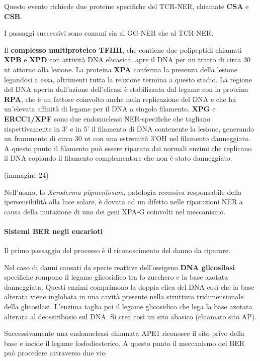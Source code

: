 \documentclass[]{article}
\begin{document}
Questo evento richiede due proteine specifiche del TCR-NER, chiamate
\textbf{CSA} e \textbf{CSB}.

I passaggi successivi sono comuni sia al GG-NER che al TCR-NER.

Il \textbf{complesso multiproteico TFIIH}, che contiene due polipeptidi
chiamati \textbf{XPB} e \textbf{XPD} con attività DNA elicasica, apre il
DNA per un tratto di circa 30 nt attorno alla lesione. La proteina
\textbf{XPA} conferma la presenza della lesione legandosi a essa,
altrimenti tutta la reazione termina a questo stadio. La regione del DNA
aperta dall'azione dell'elicasi è stabilizzata dal legame con la
proteina \textbf{RPA}, che è un fattore coinvolto anche nella
replicazione del DNA e che ha un'elevata affinità di legame per il DNA a
singolo filamento. \textbf{XPG} e \textbf{ERCC1/XPF} sono due
endonucleasi NER-specifiche che tagliano rispettivamente in 3' e in 5'
il filamento di DNA contenente la lesione, generando un frammento di
circa 30 nt con una estremità 3'OH nel filamento danneggiato. A questo
punto il filamento può essere riparato dai normali enzimi che replicano
il DNA copiando il filamento complementare che non è stato danneggiato.

(immagine 24)

Nell'uomo, lo \emph{Xeroderma pigmentosum}, patologia recessiva
responsabile della ipersensibilità alla luce solare, è dovuta ad un
difetto nelle riparazioni NER a causa della mutazione di uno dei geni
XPA-G coinvolti nel meccanismo.

\paragraph{Sistemi BER negli
eucarioti}\label{sistemi-ber-negli-eucarioti}

Il primo passaggio del processo è il riconoscimento del danno da
riparare.

Nel caso di danni causati da specie reattive dell'ossigeno \textbf{DNA
glicosilasi} specifiche rompono il legame glicosidico tra lo zucchero e
la base azotata danneggiata. Questi enzimi comprimono la doppia elica
del DNA così che la base alterata viene inglobata in una cavità presente
nella struttura tridimensionale della glicosilasi. L'enzima taglia poi
il legame glicosidico che lega la base azotata alterata al deossiribosio
sul DNA. Si crea così un sito abasico (chiamato sito AP).

Successivamente una endonucleasi chiamata APE1 riconosce il sito privo
della base e incide il legame fosfodiesterico. A questo punto il
meccanismo del BER può procedere attraverso due vie:
\end{document}
